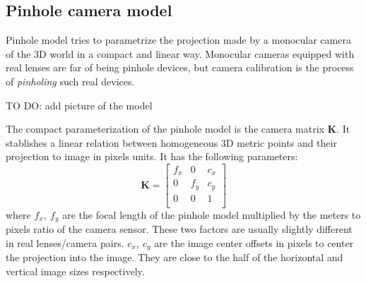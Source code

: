 \subsection{Pinhole camera model}
Pinhole model tries to parametrize the projection made by a monocular camera of the 3D world in a compact and linear way. Monocular cameras equipped with real lenses are far of being pinhole devices, but camera calibration is the process of \textit{pinholing} such real devices. 

TO DO: add picture of the model

The compact parameterization of the pinhole model is the camera matrix $\mathbf{K}$. It  stablishes a linear relation between homogeneous 3D metric points and their projection to image in pixels units. It has the following parameters: 
\begin{equation}
 \mathbf{K} = 
 \left[
 \begin{array}{ccc}
  f_x & 0 & c_x \\
  0 & f_y & c_y \\
  0 & 0 & 1 \\
 \end{array}
\right]
\end{equation}
where $f_x,\ f_y$ are the focal length of the pinhole model multiplied by the meters to pixels ratio of the camera sensor. These two factors are usually slightly different in real lenses/camera pairs. $c_x,\ c_y$ are the image center offsets in pixels to center the projection into the image. They are close to the half of the horizontal and vertical image sizes respectively. 

